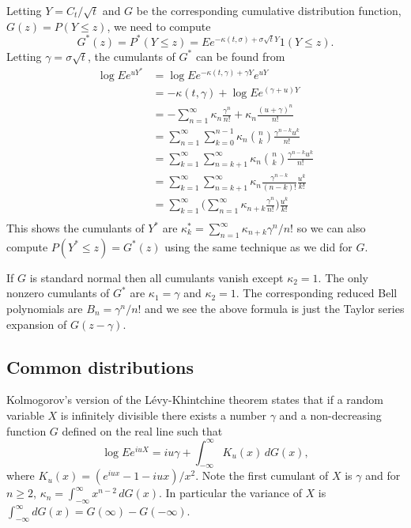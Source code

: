\documentclass[11pt]{article}
\begin{document}
Letting \(Y = C_t/\sqrt{t}\) and \(G\) be the corresponding cumulative
distribution function, \(G(z) = P(Y\le z)\), we need to compute
\[
G^*(z) = P^*(Y\le z) = Ee^{-\kappa(t,\sigma) + \sigma\sqrt{t}Y}1(Y\le z).
\]
Letting \(\gamma = \sigma\sqrt{t}\), the cumulants of \(G^*\) can be found from
\begin{align*}
\log E e^{uY^*} &= \log E e^{-\kappa(t,\gamma) + \gamma Y} e^{uY}\\
&= -\kappa(t, \gamma) + \log E e^{(\gamma + u) Y}\\
&= -\sum_{n=1}^\infty \kappa_n \frac{\gamma^n}{n!} 
	+ \kappa_n \frac{(u + \gamma)^n}{n!}\\
&= \sum_{n=1}^\infty \sum_{k=0}^{n-1} \kappa_n \binom{n}{k}
	\frac{\gamma^{n - k}u^k}{n!}\\
&= \sum_{k=1}^\infty \sum_{n=k + 1}^\infty \kappa_n 
	\binom{n}{k}\frac{\gamma^{n - k}u^k}{n!}\\
&= \sum_{k=1}^\infty \sum_{n=k + 1}^\infty \kappa_n \frac{\gamma^{n-k}}{(n-k)!}
	\frac{u^k}{k!}\\
&= \sum_{k=1}^\infty 
	\bigl(\sum_{n=1}^\infty \kappa_{n+k} \frac{\gamma^n}{n!}\bigr)
	\frac{u^k}{k!}\\
\end{align*}
This shows the cumulants of \(Y^*\) are 
\(\kappa^*_k = \sum_{n=1}^\infty \kappa_{n + k}\gamma^n/n!\)
so we can also compute \(P(Y^* \le z) = G^*(z)\) using the same
technique as we did for \(G\).

If \(G\) is standard normal then all cumulants vanish except \(\kappa_2 = 1\). The only nonzero cumulants of \(G^*\) are \(\kappa_1 = \gamma\)
and \(\kappa_2 = 1\). The corresponding reduced Bell polynomials
are \(B_n = \gamma^n/n!\) and we see the above formula is just
the Taylor series expansion of \(G(z - \gamma)\).
%
%
\subsection{Common distributions}

Kolmogorov's version of the L\'evy-Khintchine theorem\cite{?}
states that if a random variable \(X\) is infinitely divisible
there exists a number \(\gamma\) and a non-decreasing function
\(G\) defined on the real line such that
\[
\log Ee^{iuX} = iu\gamma + \int_{-\infty}^\infty K_u(x)\,dG(x),
\]
where \(K_u(x) = (e^{iux} - 1 - iux)/x^2\). Note the first
cumulant of \(X\) is \(\gamma\) and for \(n\ge 2\),
\(\kappa_n = \int_{-\infty}^\infty x^{n-2}\,dG(x)\). In particular
the variance of \(X\) is 
\(\int_{-\infty}^\infty dG(x) = G(\infty) - G(-\infty)\).
\end{document}
